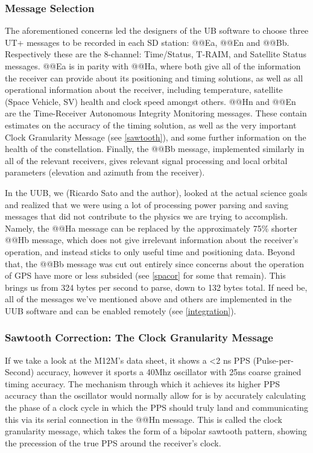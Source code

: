\subsubsection{Message Selection}
\label{messelect}
The aforementioned concerns led the designers of the UB software to choose three UT+ messages to be recorded in each SD station: @@Ea, @@En and @@Bb. Respectively these are the 8-channel: Time/Status, T-RAIM, and Satellite Status messages. @@Ea is in parity with @@Ha, where both give all of the information the receiver can provide about its positioning and timing solutions, as well as all operational information about the receiver, including temperature, satellite (Space Vehicle, SV) health and clock speed amongst others.  @@Hn and @@En are the Time-Receiver Autonomous Integrity Monitoring messages. These contain estimates on the accuracy of the timing solution, as well as the very important Clock Granularity Message (see \autoref{sawtooth}), and some further information on the health of the constellation. Finally, the @@Bb message, implemented similarly in all of the relevant receivers, gives relevant signal processing and local orbital parameters (elevation and azimuth from the receiver). 

In the UUB, we (Ricardo Sato and the author), looked at the actual science goals and realized that we were using a lot of processing power parsing and saving messages that did not contribute to the physics we are trying to accomplish. Namely, the @@Ha message can be replaced by the approximately 75\% shorter @@Hb message, which does not give irrelevant information about the receiver's operation, and instead sticks to only useful time and positioning data. Beyond that, the @@Bb message was cut out entirely since concerns about the operation of GPS have more or less subsided (see \autoref{spacor} for some that remain). This brings us from 324 bytes per second to parse, down to 132 bytes total. If need be, all of the messages we've mentioned above and others are implemented in the UUB software and can be enabled remotely (see \autoref{integration}). 

\subsubsection{Sawtooth Correction: The Clock Granularity Message}
\label{sawtooth}
If we take a look at the M12M's data sheet, it shows a \textless2 ns PPS (Pulse-per-Second) accuracy, however it sports a 40Mhz oscillator with 25ns coarse grained timing accuracy. The mechanism through which it achieves its higher PPS accuracy than the oscillator would normally allow for is by accurately calculating the phase of a clock cycle in which the PPS should truly land and communicating this via its serial connection in the @@Hn message. This is called the clock granularity message, which takes the form of a bipolar sawtooth pattern, showing the precession of the true PPS around the receiver's clock. 


